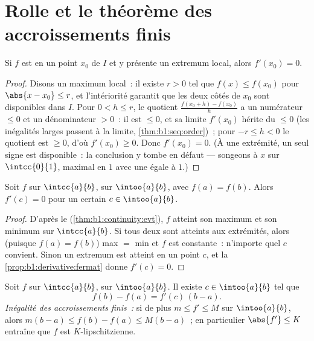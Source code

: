 \section{Rolle et le théorème des accroissements finis}

\begin{proposition}\label{prop:b1:derivative:fermat}
Si $f$ est  en un point \emph{} $x_0$ de $I$ et y
présente un extremum local, alors $f'(x_0) = 0$.
\end{proposition}

\begin{proof}
Disons un maximum local~: il existe $r > 0$ tel que $f(x) \leq f(x_0)$
pour $\abs{x - x_0} \leq r$, et l'intériorité garantit que les deux
côtés de $x_0$ sont disponibles dans $I$. Pour $0 < h \leq r$, le
quotient $\frac{f(x_0 + h) - f(x_0)}{h}$ a un numérateur $\leq 0$
et un dénominateur $> 0$~: il est $\leq 0$, et sa limite $f'(x_0)$
hérite du $\leq 0$ (les inégalités larges passent à la limite,
\cref{thm:b1:seq:order})~; pour $-r \leq h < 0$ le quotient est
$\geq 0$, d'où $f'(x_0) \geq 0$. Donc $f'(x_0) = 0$. (À une
extrémité, un seul signe est disponible~: la conclusion y tombe en défaut ---
songeons à $x$ sur $\intcc{0}{1}$, maximal en $1$ avec une  égale à
$1$.)
\end{proof}

\begin{theorem}[Rolle]\label{thm:b1:derivative:rolle}
Soit $f$  sur $\intcc{a}{b}$,  sur
$\intoo{a}{b}$, avec $f(a) = f(b)$. Alors $f'(c) = 0$ pour un certain $c \in
\intoo{a}{b}$.
\end{theorem}

\begin{proof}
D'après le  (\cref{thm:b1:continuity:evt}), $f$
atteint son maximum et son minimum sur $\intcc{a}{b}$. Si tous deux sont
atteints aux extrémités, alors (puisque $f(a) = f(b)$) max $=$ min et $f$
est constante~: n'importe quel $c$  convient. Sinon un extremum est
atteint en un point  $c$, et
la \cref{prop:b1:derivative:fermat} donne $f'(c) = 0$.
\end{proof}

\begin{theorem}\label{thm:b1:derivative:mvt}
Soit $f$  sur $\intcc{a}{b}$,  sur
$\intoo{a}{b}$. Il existe $c \in \intoo{a}{b}$ tel que
\[
f(b) - f(a) = f'(c)\,(b - a) .
\]
\emph{Inégalité des accroissements finis~:} si de plus $m \leq f' \leq M$ sur
$\intoo{a}{b}$, alors $m(b-a) \leq f(b) - f(a) \leq M(b-a)$~; en
particulier $\abs{f'} \leq K$ entraîne que $f$ est $K$-lipschitzienne.
\end{theorem}


